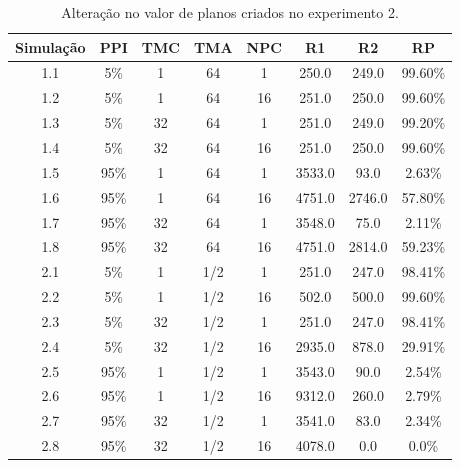 \begin{table}
    \begin{center}
        \caption{ Alteração no valor de planos criados no experimento 2. }
        \label{table:plansaltv1}
        \begin{tabular}{ |c|c|c|c|c|c|c|c| }
            \hline
            \textbf{Simulação} & \textbf{PPI} & \textbf{TMC} & \textbf{TMA} & \textbf{NPC} & \textbf{R1} & \textbf{R2} & \textbf{RP}\\
            \hline
            1.1 & 5\% & 1 & 64 & 1 & 250.0 & 249.0 & 99.60\%\\
            \hline
            1.2 & 5\% & 1 & 64 & 16 & 251.0 & 250.0 & 99.60\%\\
            \hline
            1.3 & 5\% & 32 & 64 & 1 & 251.0 & 249.0 & 99.20\%\\
            \hline
            1.4 & 5\% & 32 & 64 & 16 & 251.0 & 250.0 & 99.60\%\\
            \hline
            1.5 & 95\% & 1 & 64 & 1 & 3533.0 & 93.0 & 2.63\%\\
            \hline
            1.6 & 95\% & 1 & 64 & 16 & 4751.0 & 2746.0 & 57.80\%\\
            \hline
            1.7 & 95\% & 32 & 64 & 1 & 3548.0 & 75.0 & 2.11\%\\
            \hline
            1.8 & 95\% & 32 & 64 & 16 & 4751.0 & 2814.0 & 59.23\%\\
            \hline
            2.1 & 5\% & 1 & 1/2 & 1 & 251.0 & 247.0 & 98.41\%\\
            \hline
            2.2 & 5\% & 1 & 1/2 & 16 & 502.0 & 500.0 & 99.60\%\\
            \hline
            2.3 & 5\% & 32 & 1/2 & 1 & 251.0 & 247.0 & 98.41\%\\
            \hline
            2.4 & 5\% & 32 & 1/2 & 16 & 2935.0 & 878.0 & 29.91\%\\
            \hline
            2.5 & 95\% & 1 & 1/2 & 1 & 3543.0 & 90.0 & 2.54\%\\
            \hline
            2.6 & 95\% & 1 & 1/2 & 16 & 9312.0 & 260.0 & 2.79\%\\
            \hline
            2.7 & 95\% & 32 & 1/2 & 1 & 3541.0 & 83.0 & 2.34\%\\
            \hline
            2.8 & 95\% & 32 & 1/2 & 16 & 4078.0 & 0.0 & 0.0\%\\
            \hline
        \end{tabular}{}
    \end{center}{}
\end{table}

